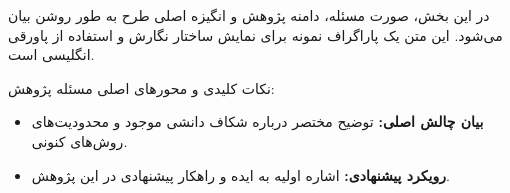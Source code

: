 
در این بخش، صورت مسئله، دامنه پژوهش و انگیزه اصلی طرح به طور روشن بیان می‌شود. این متن یک پاراگراف نمونه برای نمایش ساختار نگارش و استفاده از پاورقی انگلیسی است.

نکات کلیدی و محورهای اصلی مسئله پژوهش:
\begin{itemize}
    \item \textbf{بیان چالش اصلی:} توضیح مختصر درباره شکاف دانشی موجود و محدودیت‌های روش‌های کنونی.
    \item \textbf{رویکرد پیشنهادی:} اشاره اولیه به ایده و راهکار پیشنهادی در این پژوهش.
\end{itemize}
